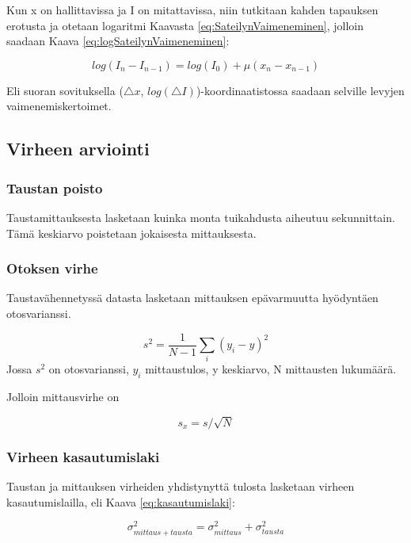 \documentclass[a4paper, 12pt]{article}
\begin{document}
Kun x on hallittavissa ja I on mitattavissa, niin tutkitaan kahden tapauksen erotusta ja otetaan logaritmi Kaavasta \ref{eq:SateilynVaimeneminen}, jolloin saadaan Kaava \ref{eq:logSateilynVaimeneminen}:

\begin{equation}
log(I_n - I_{n-1}) = log(I_0) + {\mu (x_n - x_{n-1})}
\label{eq:logSateilynVaimeneminen}
\end{equation}

Eli suoran sovituksella ($\triangle x$, $log(\triangle I)$)-koordinaatistossa saadaan selville levyjen vaimenemiskertoimet.

\subsection{Virheen arviointi}
\subsubsection{Taustan poisto}
Taustamittauksesta lasketaan kuinka monta tuikahdusta aiheutuu sekunnittain. Tämä keskiarvo poistetaan jokaisesta mittauksesta.

\subsubsection{Otoksen virhe}
Taustavähennetyssä datasta lasketaan mittauksen epävarmuutta hyödyntäen otosvarianssi.

\begin{equation}
s^2 = \dfrac{1}{N-1} \sum_i (y_i - y)^2 
\label{eq:otosvarianssi}
\end{equation}
Jossa $s^2$ on otosvarianssi, $y_i$ mittaustulos, y keskiarvo, N mittausten lukumäärä.

Jolloin mittausvirhe on

\begin{equation}
s_x=s/\sqrt{N}
\label{eq:mittausVirhe}
\end{equation}

\subsubsection{Virheen kasautumislaki}
Taustan ja mittauksen virheiden yhdistynyttä tulosta lasketaan virheen kasautumislailla, eli Kaava \ref{eq:kasautumislaki}:

\begin{equation}
\sigma_{mittaus+tausta}^2 = \sigma_{mittaus}^2 + \sigma_{tausta}^2  
\label{eq:kasautumislaki}
\end{equation}
\end{document}
